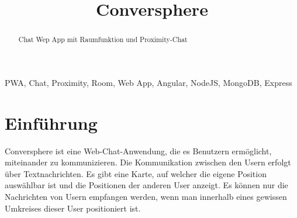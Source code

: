 \documentclass[conference]{IEEEtran}
\begin{document}
	\title{Conversphere}
	\author{
		\and
		\and
		\and
		\and
	}

	\maketitle

	\begin{abstract}
		Chat Wep App mit Raumfunktion und Proximity-Chat
	\end{abstract}

	\begin{IEEEkeywords}
		PWA, Chat, Proximity, Room, Web App, Angular, NodeJS, MongoDB, Express
	\end{IEEEkeywords}

	\section{Einführung}
	Conversphere ist eine Web-Chat-Anwendung, die es Benutzern ermöglicht, miteinander zu kommunizieren. Die Kommunikation zwischen den Usern erfolgt über Textnachrichten. Es gibt eine Karte, auf welcher die eigene Position auswählbar ist und die Positionen der anderen User anzeigt. Es können nur die Nachrichten von Usern empfangen werden, wenn man innerhalb eines gewissen Umkreises dieser User positioniert ist.
	
\end{document}
